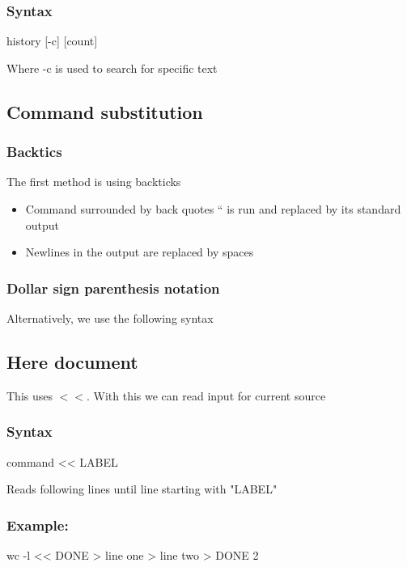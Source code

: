 \documentclass{report}
\begin{document}
    \subsubsection{Syntax}
    \begin{bashcode}
        history [-c] [count]
    \end{bashcode}
    \bigbreak \noindent 
    Where -c is used to search for specific text
    \bigbreak \noindent 
    \bigbreak \noindent 
    \subsection{Command substitution}
    \bigbreak \noindent 
    \subsubsection{Backtics}
    The first method is using backticks
    \begin{itemize}
        \item Command surrounded by back quotes `` is run and replaced by its standard output
        \item Newlines in the output are replaced by spaces
    \end{itemize}
    \bigbreak \noindent 
    \subsubsection{Dollar sign parenthesis notation}
    \bigbreak \noindent 
    Alternatively, we use the following syntax
    \bigbreak \noindent 
    \subsection{Here document}
    \bigbreak \noindent 
    This uses $<<$. With this we can read input for current source
    \bigbreak \noindent 
    \subsubsection{Syntax}
    \begin{bashcode}
    command << LABEL
    \end{bashcode}
    \bigbreak \noindent 
    Reads following lines until line starting with "LABEL"
    \bigbreak \noindent 
    \subsubsection{Example:}
    \begin{bashcode}
     wc -l << DONE
        > line one
        > line two 
        > DONE
    2
    \end{bashcode}
    \pagebreak 
\end{document}
